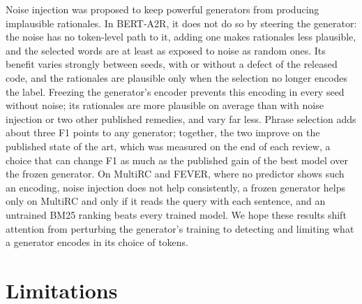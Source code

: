 \documentclass[11pt]{article}
\begin{document}
Noise injection was proposed to keep powerful generators from producing implausible rationales. In BERT-A2R, it does not do so by steering the generator: the noise has no token-level path to it, adding one makes rationales less plausible, and the selected words are at least as exposed to noise as random ones. Its benefit varies strongly between seeds, with or without a defect of the released code, and the rationales are plausible only when the selection no longer encodes the label. Freezing the generator's encoder prevents this encoding in every seed without noise; its rationales are more plausible on average than with noise injection or two other published remedies, and vary far less. Phrase selection adds about three F1 points to any generator; together, the two improve on the published state of the art, which was measured on the end of each review, a choice that can change F1 as much as the published gain of the best model over the frozen generator. On MultiRC and FEVER, where no predictor shows such an encoding, noise injection does not help consistently, a frozen generator helps only on MultiRC and only if it reads the query with each sentence, and an untrained BM25 ranking beats every trained model. We hope these results shift attention from perturbing the generator's training to detecting and limiting what a generator encodes in its choice of tokens.

\section*{Limitations}
\end{document}
